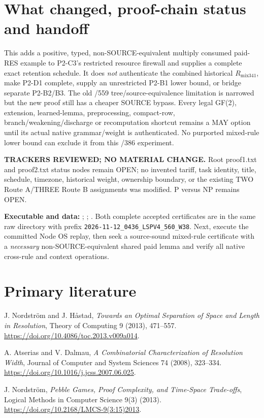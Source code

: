 \documentclass[11pt]{article}
\begin{document}
\section*{What changed, proof-chain status and handoff}
This adds a positive, typed, non-SOURCE-equivalent multiply consumed paid-RES example to P2-C3's restricted resource firewall and supplies a complete exact retention schedule. It does \emph{not} authenticate the combined historical $R_{\mathrm{mix341}}$, make P2-D1 complete, supply an unrestricted P2-B1 lower bound, or bridge separate P2-B2/B3. The old /559 tree/source-equivalence limitation is narrowed but the new proof still has a cheaper SOURCE bypass. Every legal GF(2), extension, learned-lemma, preprocessing, compact-row, branch/weakening/discharge or recomputation shortcut remains a MAY option until its actual native grammar/weight is authenticated. No purported mixed-rule lower bound can exclude it from this /386 experiment.

\noindent\textbf{TRACKERS REVIEWED; NO MATERIAL CHANGE.}
Root proof1.txt and proof2.txt status nodes remain OPEN; no invented tariff, task identity, title, schedule, timezone, historical weight, ownership boundary, or the existing TWO Route A/THREE Route B assignments was modified. P versus NP remains OPEN.

\noindent\textbf{Executable and data:}
;
;
.
Both complete accepted certificates are in the same raw directory with prefix \texttt{2026-11-12\_0436\_LSPV4\_560\_W38}. Next, execute the committed Node OS replay, then seek a source-sound mixed-rule certificate with a \emph{necessary} non-SOURCE-equivalent shared paid lemma and verify all native cross-rule and context operations.

\section*{Primary literature}
\noindent [1] J. Nordstr\"om and J. H{\aa}stad, \emph{Towards an Optimal Separation of Space and Length in Resolution}, Theory of Computing 9 (2013), 471--557. \url{https://doi.org/10.4086/toc.2013.v009a014}.

\noindent [2] A. Atserias and V. Dalmau, \emph{A Combinatorial Characterization of Resolution Width}, Journal of Computer and System Sciences 74 (2008), 323--334. \url{https://doi.org/10.1016/j.jcss.2007.06.025}.

\noindent [3] J. Nordstr\"om, \emph{Pebble Games, Proof Complexity, and Time-Space Trade-offs}, Logical Methods in Computer Science 9(3) (2013). \url{https://doi.org/10.2168/LMCS-9(3:15)2013}.
\end{document}
